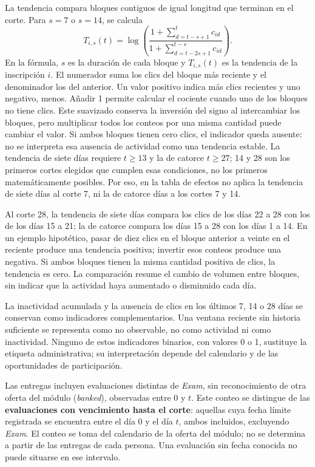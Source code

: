 La tendencia compara bloques contiguos de igual longitud que terminan en el corte. Para $s=7$ o $s=14$, se calcula
\[
T_{i,s}(t)=\log\!\left(\frac{1+\sum_{d=t-s+1}^{t}c_{id}}
{1+\sum_{d=t-2s+1}^{t-s}c_{id}}\right).
\]
En la fórmula, $s$ es la duración de cada bloque y $T_{i,s}(t)$ es la tendencia de la inscripción $i$. El numerador suma los clics del bloque más reciente y el denominador los del anterior. Un valor positivo indica más clics recientes y uno negativo, menos. Añadir 1 permite calcular el cociente cuando uno de los bloques no tiene clics. Este suavizado conserva la inversión del signo al intercambiar los bloques, pero multiplicar todos los conteos por una misma cantidad puede cambiar el valor. Si ambos bloques tienen cero clics, el indicador queda ausente: no se interpreta esa ausencia de actividad como una tendencia estable. La tendencia de siete días requiere $t\ge13$ y la de catorce $t\ge27$; 14 y 28 son los primeros cortes elegidos que cumplen esas condiciones, no los primeros matemáticamente posibles. Por eso, en la tabla de efectos no aplica la tendencia de siete días al corte 7, ni la de catorce días a los cortes 7 y 14.

Al corte 28, la tendencia de siete días compara los clics de los días 22 a 28 con los de los días 15 a 21; la de catorce compara los días 15 a 28 con los días 1 a 14. En un ejemplo hipotético, pasar de diez clics en el bloque anterior a veinte en el reciente produce una tendencia positiva; invertir esos conteos produce una negativa. Si ambos bloques tienen la misma cantidad positiva de clics, la tendencia es cero. La comparación resume el cambio de volumen entre bloques, sin indicar que la actividad haya aumentado o disminuido cada día.

La inactividad acumulada y la ausencia de clics en los últimos 7, 14 o 28 días se conservan como indicadores complementarios. Una ventana reciente sin historia suficiente se representa como no observable, no como actividad ni como inactividad. Ninguno de estos indicadores binarios, con valores 0 o 1, sustituye la etiqueta administrativa; su interpretación depende del calendario y de las oportunidades de participación.

Las entregas incluyen evaluaciones distintas de \textit{Exam}, sin reconocimiento de otra oferta del módulo (\textit{banked}), observadas entre 0 y $t$. Este conteo se distingue de las \textbf{evaluaciones con vencimiento hasta el corte}: aquellas cuya fecha límite registrada se encuentra entre el día 0 y el día $t$, ambos incluidos, excluyendo \textit{Exam}. El conteo se toma del calendario de la oferta del módulo; no se determina a partir de las entregas de cada persona. Una evaluación sin fecha conocida no puede situarse en ese intervalo.

